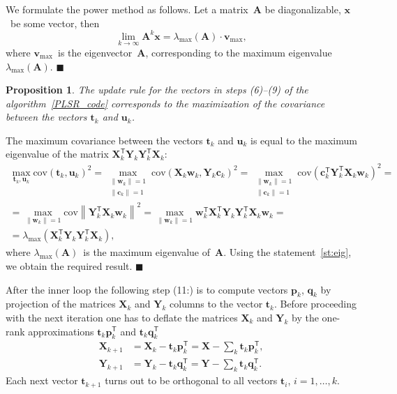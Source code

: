 \documentclass[12pt,twoside]{article}
\newtheorem{proposition}{Proposition}
\theoremstyle{definition}
\newcommand{\bx}{\mathbf{x}}
\newcommand{\bw}{\mathbf{w}}
\newcommand{\bY}{\mathbf{Y}}
\newcommand{\bX}{\mathbf{X}}
\newcommand{\bu}{\mathbf{u}}
\newcommand{\bt}{\mathbf{t}}
\newcommand{\bp}{\mathbf{p}}
\newcommand{\bq}{\mathbf{q}}
\newcommand{\bc}{\mathbf{c}}
\newcommand{\T}{\mathsf{T}}
\begin{document}
We formulate the power method as follows. Let a matrix~$\mathbf{A}$ be diagonalizable, $\bx$~be some vector, then
\begin{equation*}
\lim_{k \rightarrow \infty} \mathbf{A}^k \bx = \lambda_{\max}(\mathbf{A}) \cdot \mathbf{v}_{\max},
\end{equation*}
where $\mathbf{v}_{\max}$~is the eigenvector~$\mathbf{A}$, corresponding to the maximum eigenvalue~$ \lambda_{\max} (\mathbf{A})$.
$\blacksquare$

\begin{proposition}
	The update rule for the vectors in steps (6)--(9) of the algorithm~\ref{PLSR_code} corresponds to the maximization of the covariance between the vectors $\bt_k$ and $\bu_k$.
\end{proposition}

The maximum covariance between the vectors $\bt_k$ and $\bu_k$ is equal to the maximum eigenvalue of the matrix $\bX_k^{\T} \bY_k \bY_k^{\T} \bX_k$:
\begin{multline*}
\max_{\bt_k, \bu_k}  \text{cov} (\bt_k, \bu_k)^2 = \max_{\substack{\|\bw_k\|=1 \\ \|\bc_k\| = 1}} \text{cov} \left( \bX_k \bw_k, \bY_k \bc_k \right)^2 = \max_{\substack{\|\bw_k\|=1 \\ \|\bc_k\| = 1}} \text{cov} \left(\bc_k^{\T}  \bY_k^{\T} \bX_k \bw_k \right)^2 = \\
= \max_{\|\bw_k\| = 1} \text{cov} \left\|\bY_k^{\T} \bX_k \bw_k \right\|^2 = \max_{\|\bw_k\| = 1} \bw_k^{\T} \bX_k^{\T} \bY_k \bY_k^{\T} \bX_k \bw_k = \\
= \lambda_{\max} \left( \bX_k^{\T} \bY_k \bY_k^{\T} \bX_k \right),
\end{multline*}
where $ \lambda_{\max} (\mathbf{A})$~is the maximum eigenvalue of~$\mathbf{A}$.
Using the statement~\ref{st:eig}, we obtain the required result.
$\blacksquare$

After the inner loop the following step (11:) is to compute vectors $\bp_k$, $\bq_k$ by projection of the matrices $\bX_k$ and $\bY_k$ columns to the vector $\bt_k$. 
Before proceeding with the next iteration one has to deflate the matrices $\bX_k$ and $\bY_k$ by the one-rank approximations $\bt_k \bp_k^{\T}$ and $\bt_k \bq_k^{\T}$
\begin{align}
\bX_{k + 1} &= \bX_{k} - \bt_k \bp_k^{\T} = \bX - \sum_k \bt_k \bp_k^{\T}, 
\label{eq:deviation_X} \\
\bY_{k + 1} &= \bY_{k} - \bt_k \bq_k^{\T} = \bY - \sum_k \bt_k \bq_k^{\T}.
\label{eq:deviation_Y}
\end{align}
Each next vector $\bt_{k+1}$ turns out to be orthogonal to all vectors $\bt_i$, $i=1, \dots, k$.
\end{document}
